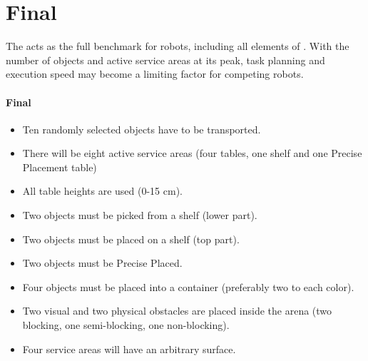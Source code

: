 \section{Final}
\label{sec:Final}

The  acts as the full benchmark for robots, including all elements of \RCAW.
With the number of objects and active service areas at its peak, task planning and execution speed may become a limiting factor for competing robots. 

\paragraph{Final}
\begin{itemize}
\item Ten randomly selected objects have to be transported.
\item There will be eight active service areas (four tables,  one shelf and one Precise Placement table)
\item All table heights are used (0-15 $\si{\centi\meter}$).
\item Two objects must be picked from a shelf (lower part).
\item Two objects must be placed on a shelf (top part).
\item Two objects must be Precise Placed.
\item Four objects must be placed into a container (preferably two to each color).
\item Two visual and two physical obstacles are placed inside the arena (two blocking, one semi-blocking, one non-blocking).
\item Four service areas will have an arbitrary surface.
\end{itemize}
